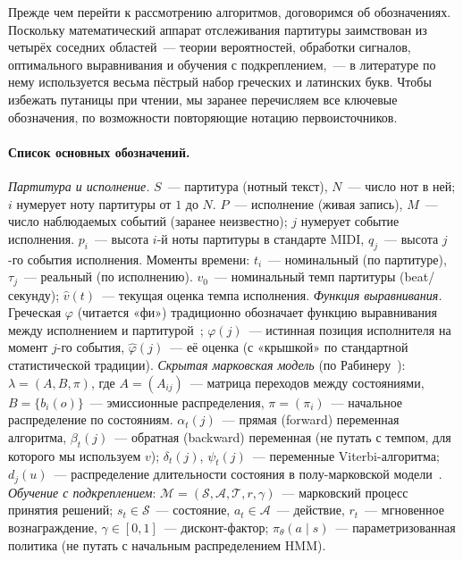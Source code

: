 %
Прежде чем перейти к рассмотрению алгоритмов, договоримся об
обозначениях. Поскольку математический аппарат отслеживания
партитуры заимствован из четырёх соседних областей~--- теории
вероятностей, обработки сигналов, оптимального выравнивания и
обучения с подкреплением,~--- в литературе по нему используется
весьма пёстрый набор греческих и латинских букв. Чтобы избежать
путаницы при чтении, мы заранее перечисляем все ключевые
обозначения, по возможности повторяющие нотацию первоисточников.

\paragraph*{Список основных обозначений.}
\textit{Партитура и исполнение.} $S$~--- партитура (нотный
текст), $N$~--- число нот в ней; $i$ нумерует ноту партитуры от
$1$ до $N$. $P$~--- исполнение (живая запись), $M$~--- число
наблюдаемых событий (заранее неизвестно); $j$ нумерует событие
исполнения. $p_i$~--- высота $i$-й ноты партитуры в стандарте
MIDI, $q_j$~--- высота $j$-го события исполнения. Моменты
времени: $t_i$~--- номинальный (по партитуре), $\tau_j$~---
реальный (по исполнению). $v_0$~--- номинальный темп
партитуры (beat/секунду); $\hat v(t)$~--- текущая оценка темпа
исполнения.
\textit{Функция выравнивания.} Греческая $\varphi$ (читается
«фи») традиционно обозначает функцию выравнивания между
исполнением и партитурой~\cite{Cont2010,Mueller2007}; $\varphi(j)$~---
истинная позиция исполнителя на момент $j$-го события,
$\hat\varphi(j)$~--- её оценка (с «крышкой» по стандартной
статистической традиции).
\textit{Скрытая марковская модель} (по Рабинеру~\cite{Rabiner1989}):
$\lambda = (A, B, \pi)$, где $A=(A_{ij})$~--- матрица
переходов между состояниями, $B = \{b_i(o)\}$~--- эмиссионные
распределения, $\pi=(\pi_i)$~--- начальное распределение по
состояниям. $\alpha_t(j)$~--- прямая (forward) переменная
алгоритма, $\beta_t(j)$~--- обратная (backward) переменная
(не путать с темпом, для которого мы используем $v$);
$\delta_t(j)$, $\psi_t(j)$~--- переменные Viterbi-алгоритма;
$d_j(u)$~--- распределение длительности состояния в
полу-марковской модели~\cite{Cont2010}.
\textit{Обучение с подкреплением}: $\mathcal{M} = (\mathcal{S},
\mathcal{A}, \mathcal{T}, r, \gamma)$~--- марковский процесс
принятия решений; $s_t \in \mathcal{S}$~--- состояние,
$a_t \in \mathcal{A}$~--- действие, $r_t$~--- мгновенное
вознаграждение, $\gamma \in [0, 1]$~--- дисконт-фактор;
$\pi_\theta(a\mid s)$~--- параметризованная политика
(не путать с начальным распределением HMM).

